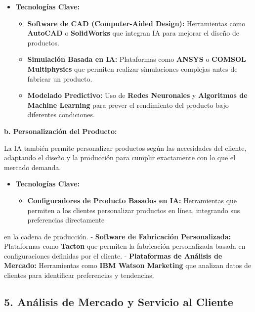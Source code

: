 \documentclass[
  letterpaper,
]{book}
\providecommand{\tightlist}{%
  \setlength{\itemsep}{0pt}\setlength{\parskip}{0pt}}\usepackage{longtable,booktabs,array}
\begin{document}
\begin{itemize}
\tightlist
\item
  \textbf{Tecnologías Clave:}

  \begin{itemize}
  \tightlist
  \item
    \textbf{Software de CAD (Computer-Aided Design):} Herramientas como
    \textbf{AutoCAD} o \textbf{SolidWorks} que integran IA para mejorar
    el diseño de productos.
  \item
    \textbf{Simulación Basada en IA:} Plataformas como \textbf{ANSYS} o
    \textbf{COMSOL Multiphysics} que permiten realizar simulaciones
    complejas antes de fabricar un producto.
  \item
    \textbf{Modelado Predictivo:} Uso de \textbf{Redes Neuronales} y
    \textbf{Algoritmos de Machine Learning} para prever el rendimiento
    del producto bajo diferentes condiciones.
  \end{itemize}
\end{itemize}

\textbf{b. Personalización del Producto:}

La IA también permite personalizar productos según las necesidades del
cliente, adaptando el diseño y la producción para cumplir exactamente
con lo que el mercado demanda.

\begin{itemize}
\tightlist
\item
  \textbf{Tecnologías Clave:}

  \begin{itemize}
  \tightlist
  \item
    \textbf{Configuradores de Producto Basados en IA:} Herramientas que
    permiten a los clientes personalizar productos en línea, integrando
    sus preferencias directamente
  \end{itemize}
\end{itemize}

en la cadena de producción. - \textbf{Software de Fabricación
Personalizada:} Plataformas como \textbf{Tacton} que permiten la
fabricación personalizada basada en configuraciones definidas por el
cliente. - \textbf{Plataformas de Análisis de Mercado:} Herramientas
como \textbf{IBM Watson Marketing} que analizan datos de clientes para
identificar preferencias y tendencias.

\subsection{\texorpdfstring{5. \textbf{Análisis de Mercado y Servicio al
Cliente}}{5. Análisis de Mercado y Servicio al Cliente}}\label{anuxe1lisis-de-mercado-y-servicio-al-cliente}
\end{document}
